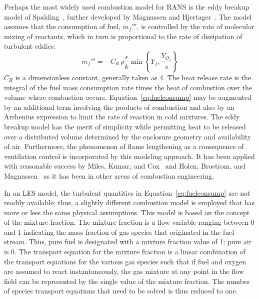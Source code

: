 \documentclass[graybox]{svmult}
\begin{document}
Perhaps the most widely used combustion model for RANS is the eddy breakup model of Spalding~\cite{Spalding:1971}, further developed by Magnussen and Hjertager~\cite{Magnussen}. The model assumes that the consumption of fuel, $\dot{m}_f'''$, is controlled by the rate of molecular mixing of reactants, which in turn is proportional to the rate of dissipation of turbulent eddies:
\begin{equation}
\dot{m}_f''' = -C_R \, \rho \frac{\epsilon}{k} \min \left\{ Y_f, \frac{Y_{O_2}}{s} \right\}
\label{eq:fuelconsump}
\end{equation}
$C_R$ is a dimensionless constant, generally taken as 4. The heat release rate is the integral of the fuel mass consumption rate times the heat of combustion over the volume where combustion occurs. Equation~\ref{eq:fuelconsump} may be augmented by an additional term involving the products of combustion and also by an Arrhenius expression to limit the rate of reaction in cold mixtures. The eddy breakup model has the merit of simplicity while permitting heat to be released over a distributed volume determined by the enclosure geometry and availability of air. Furthermore, the phenomenon of flame lengthening as a consequence of ventilation control is incorporated by this modeling approach. It has been applied with reasonable success by Miles, Kumar, and Cox~\cite{Miles} and Holen, Brostrom, and Magnussen~\cite{Holen} as it has been in other areas of combustion engineering.

In an LES model, the turbulent quantities in Equation~\ref{eq:fuelconsump} are not readily available; thus, a slightly different combustion model is employed that has more or less the same physical assumptions. This model is based on the concept of the mixture fraction. The mixture fraction is a flow variable ranging between 0 and 1 indicating the mass fraction of gas species that originated in the fuel stream. Thus, pure fuel is designated with a mixture fraction value of 1; pure air is 0. The transport equation for the mixture fraction is a linear combination of the transport equations for the various gas species such that if fuel and oxygen are assumed to react instantaneously, the gas mixture at any point in the flow field can be represented by the single value of the mixture fraction. The number of species transport equations that need to be solved is thus reduced to one.
\end{document}
